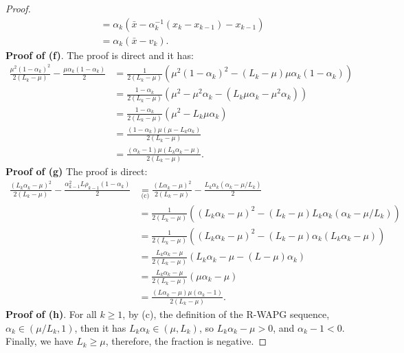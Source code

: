 \documentclass[12pt]{article}
\begin{document}
\begin{proof}
\begin{align*}
                &= \alpha_k(\bar x - \alpha_k^{-1}(x_k - x_{k - 1}) - x_{k - 1})
                \\
                &= \alpha_k (\bar x - v_k).
            \end{align*}
            \textbf{Proof of (f)}. 
            The proof is direct and it has: 
            \begin{align*}
                \frac{\mu^2(1 - \alpha_k)^2}{2(L_k - \mu)} - \frac{\mu\alpha_k(1 - \alpha_k)}{2}
                &= 
                \frac{1}{2(L_k - \mu)}\left(
                    \mu^2(1 - \alpha_k)^2 - (L_k - \mu)\mu \alpha_k(1 - \alpha_k)
                \right)
                \\
                &= \frac{1 - \alpha_k}{2(L_k - \mu)}\left(
                    \mu^2 - \mu^2\alpha_k - (L_k \mu \alpha_k - \mu^2 \alpha_k)
                \right)
                \\
                &= 
                \frac{1 - \alpha_k}{2(L_k - \mu)}\left(
                    \mu^2 - L_k\mu\alpha_k
                \right)
                \\
                &= \frac{(1 - \alpha_k)\mu(\mu - L_k\alpha_k)}{2(L_k - \mu)} 
                \\
                &= \frac{(\alpha_k - 1)\mu(L_k\alpha_k - \mu)}{2(L_k - \mu)}. 
            \end{align*}
            \textbf{Proof of (g)}
            The proof is direct: 
            \begin{align*}
                \frac{(L_k\alpha_k - \mu)^2}{2(L_k - \mu)} - \frac{\alpha_{k - 1}^2 L \rho_{k - 1}(1 - \alpha_k)}{2}
                &\underset{\text{(c)}}{=} \frac{(L\alpha_k - \mu)^2}{2(L_k - \mu)} - \frac{L_k\alpha_k(\alpha_k - \mu/L_k)}{2}
                \\
                &= \frac{1}{2(L_k - \mu)}\left(
                    (L_k\alpha_k - \mu)^2 - (L_k - \mu)L_k\alpha_k(\alpha_k - \mu/L_k)
                \right)
                \\
                &= 
                \frac{1}{2(L_k - \mu)}\left(
                    (L_k\alpha_k - \mu)^2 - (L_k - \mu)\alpha_k(L_k\alpha_k - \mu)
                \right)
                \\
                &= \frac{L_k\alpha_k - \mu}{2(L_k - \mu)}\left(
                    L_k\alpha_k - \mu - (L - \mu)\alpha_k
                \right)
                \\
                &= \frac{L_k\alpha_k - \mu}{2(L_k - \mu)}\left(
                    \mu\alpha_k - \mu
                \right)
                \\
                &= \frac{(L\alpha_k - \mu)\mu(\alpha_k - 1)}{2(L_k - \mu)}. 
            \end{align*}
            \textbf{Proof of (h)}. 
            For all $k \ge 1$, by (c), the definition of the R-WAPG sequence, $\alpha_k \in (\mu/L_k, 1)$, then it has $L_k\alpha_k \in (\mu, L_k)$, so $L_k\alpha_k - \mu > 0$, and $\alpha_k - 1 < 0$. 
            Finally, we have $L_k \ge \mu$, therefore, the fraction is negative. 
        \end{proof}
\end{document}
